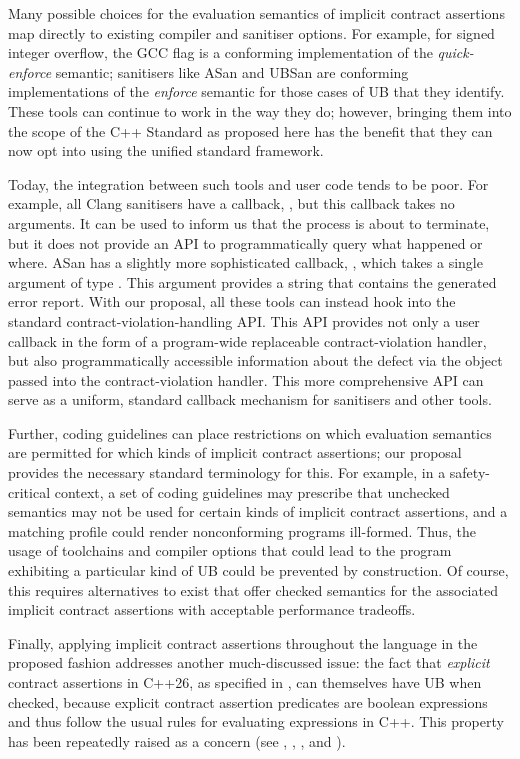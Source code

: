 Many possible choices for the evaluation semantics of implicit contract assertions map directly to existing compiler and sanitiser options. For example, for signed integer overflow, the GCC flag  is a conforming implementation of the \emph{quick-enforce} semantic; sanitisers like ASan and UBSan are conforming implementations of the \emph{enforce} semantic for those cases of UB that they identify. These tools can continue to work in the way they do; however, bringing them into the scope of the C++ Standard as proposed here has the benefit that they can now opt into using the unified standard framework.

Today, the integration between such tools and user code tends to be poor. For example, all Clang sanitisers have a callback, , but this callback takes no arguments. It can be used to inform us that the process is about to terminate, but it does not provide an API to programmatically query what happened or where. ASan has a slightly more sophisticated callback, , which takes a single argument of type . This argument provides a string that contains the generated error report. With our proposal, all these tools can instead hook into the standard contract-violation-handling API. This API provides not only a user callback in the form of a  program-wide replaceable contract-violation handler, but also programmatically accessible information about the defect via the  \mbox{} object passed into the contract-violation handler. This more comprehensive API can serve as a uniform, standard callback mechanism for sanitisers and other tools.

Further, coding guidelines can place restrictions on which evaluation semantics are permitted for which kinds of implicit contract assertions; our proposal provides the necessary standard terminology for this. For example, in a safety-critical context, a set of coding guidelines may prescribe that unchecked semantics may not be used for certain kinds of implicit contract assertions, and a matching profile could render nonconforming programs ill-formed. Thus, the usage of toolchains and compiler options that could lead to the program exhibiting a particular kind of UB could be prevented by construction. Of course, this requires alternatives to exist that offer checked semantics for the associated implicit contract assertions with acceptable performance tradeoffs.

Finally, applying implicit contract assertions throughout the language in the proposed fashion addresses another much-discussed issue: the fact that \emph{explicit} contract assertions in C++26, as specified in \cite{P2900R14}, can themselves have UB when checked, because explicit contract assertion predicates are boolean expressions and thus follow the usual rules for evaluating expressions in C++. This property has been repeatedly raised as a concern (see \cite{P2680R1}, \cite{P3173R0}, \cite{P3285R0}, and \cite{P3362R0}).

